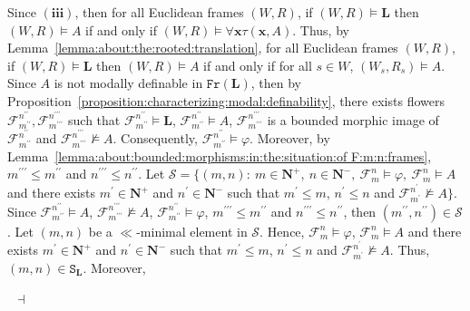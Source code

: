 \documentclass[draft]{article}
\newenvironment{proof}{{\bf Proof:}}{~$\dashv$\\}
\def\Fr{\mathtt{Fr}}
\def\L{\mathbf{L}}
\begin{document}
\begin{proof}
Since $\mathbf{(iii)}$, then for all Euclidean frames $(W,R)$, if $(W,R){\models}\L$ then $(W,R){\models}A$ if and only if $(W,R){\models}\forall\mathbf{x}\tau(\mathbf{x},A)$.
Thus, by Lemma~\ref{lemma:about:the:rooted:translation}, for all Euclidean frames $(W,R)$, if $(W,R){\models}\L$ then $(W,R){\models}A$ if and only if for all $s{\in}W$, $(W_{s},R_{s}){\models}A$.
Since $A$ is not modally definable in $\Fr(\L)$, then by Proposition~\ref{proposition:characterizing:modal:definability}, there exists flowers ${\mathcal F}_{m^{\prime\prime}}^{n^{\prime\prime}},{\mathcal F}_{m^{\prime\prime\prime}}^{n^{\prime\prime\prime}}$ such that ${\mathcal F}_{m^{\prime\prime}}^{n^{\prime\prime}}{\models}\L$, ${\mathcal F}_{m^{\prime\prime}}^{n^{\prime\prime}}{\models}A$, ${\mathcal F}_{m^{\prime\prime\prime}}^{n^{\prime\prime\prime}}$ is a bounded morphic image of ${\mathcal F}_{m^{\prime\prime}}^{n^{\prime\prime}}$ and ${\mathcal F}_{m^{\prime\prime\prime}}^{n^{\prime\prime\prime}}{\not\models}A$.
Consequently, ${\mathcal F}_{m^{\prime\prime}}^{n^{\prime\prime}}{\models}\varphi$.
Moreover, by Lemma~\ref{lemma:about:bounded:morphisms:in:the:situation:of F:m:n:frames}, $m^{\prime\prime\prime}{\leq}m^{\prime\prime}$ and $n^{\prime\prime\prime}{\leq}n^{\prime\prime}$.
Let ${\mathcal S}{=}\{(m,n):\ m{\in}\mathbf{N}^{+},\ n{\in}\mathbf{N}^{-},\ {\mathcal F}_{m}^{n}{\models}\varphi,\ {\mathcal F}_{m}^{n}{\models}A$ and there exists $m^{\prime}{\in}\mathbf{N}^{+}$ and $n^{\prime}{\in}\mathbf{N}^{-}$ such that $m^{\prime}{\leq}m$, $n^{\prime}{\leq}n$ and ${\mathcal F}_{m^{\prime}}^{n^{\prime}}{\not\models}A\}$.
Since ${\mathcal F}_{m^{\prime\prime}}^{n^{\prime\prime}}{\models}A$, ${\mathcal F}_{m^{\prime\prime\prime}}^{n^{\prime\prime\prime}}{\not\models}A$, ${\mathcal F}_{m^{\prime\prime}}^{n^{\prime\prime}}{\models}\varphi$, $m^{\prime\prime\prime}{\leq}m^{\prime\prime}$ and $n^{\prime\prime\prime}{\leq}n^{\prime\prime}$, then $(m^{\prime\prime},n^{\prime\prime}){\in}{\mathcal S}$.
Let $(m,n)$ be a $\ll$-minimal element in ${\mathcal S}$.
Hence, ${\mathcal F}_{m}^{n}{\models}\varphi$, ${\mathcal F}_{m}^{n}{\models}A$ and there exists $m^{\prime}{\in}\mathbf{N}^{+}$ and $n^{\prime}{\in}\mathbf{N}^{-}$ such that $m^{\prime}{\leq}m$, $n^{\prime}{\leq}n$ and ${\mathcal F}_{m^{\prime}}^{n^{\prime}}{\not\models}A$.
Thus, $(m,n){\in}\mathtt{S}_{\L}$.
Moreover,

\end{proof}
\end{document}
